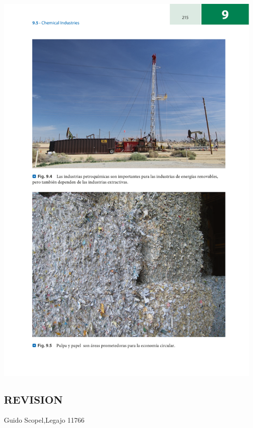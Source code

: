 \documentclass[runningheads]{llncs}
\begin{document}
\includegraphics[scale=0.95]{9(5).pdf}


\subsection{REVISION}
Guido Scopel,Legajo 11766

%

%
%
%
% 
% 
%
\end{document}
